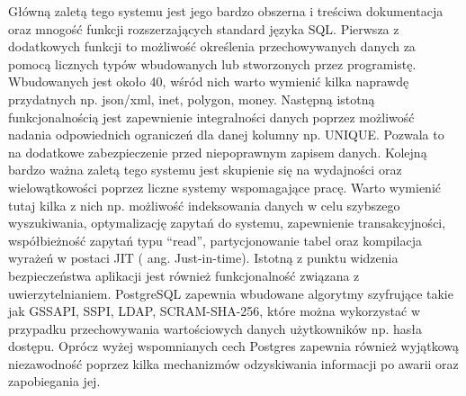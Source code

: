 Główną zaletą tego systemu jest jego bardzo obszerna i treściwa dokumentacja oraz mnogość funkcji rozszerzających standard języka SQL. Pierwsza z dodatkowych funkcji to możliwość określenia przechowywanych danych za pomocą licznych typów wbudowanych lub stworzonych przez programistę. Wbudowanych jest około 40, wśród nich warto wymienić kilka naprawdę przydatnych np. json/xml, inet, polygon, money. Następną istotną funkcjonalnością jest zapewnienie integralności danych poprzez możliwość nadania odpowiednich ograniczeń dla danej kolumny np. UNIQUE. Pozwala to na dodatkowe zabezpieczenie przed niepoprawnym zapisem danych. Kolejną bardzo ważna zaletą tego systemu jest skupienie się na wydajności oraz wielowątkowości poprzez liczne systemy wspomagające pracę. Warto wymienić tutaj kilka z nich np. możliwość indeksowania danych w celu szybszego wyszukiwania, optymalizację zapytań do systemu, zapewnienie transakcyjności, współbieżność zapytań typu “read”, partycjonowanie tabel oraz kompilacja wyrażeń w postaci JIT ( ang. Just-in-time). Istotną z punktu widzenia bezpieczeństwa aplikacji jest również funkcjonalność związana z uwierzytelnianiem. PostgreSQL zapewnia wbudowane algorytmy szyfrujące takie jak GSSAPI, SSPI, LDAP, SCRAM-SHA-256, które można wykorzystać w przypadku przechowywania wartościowych danych użytkowników np. hasła dostępu. Oprócz wyżej wspomnianych cech Postgres zapewnia również wyjątkową niezawodność poprzez kilka mechanizmów odzyskiwania informacji po awarii oraz zapobiegania jej.


